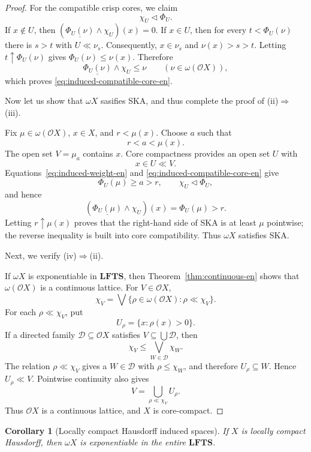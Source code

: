 \documentclass[11pt,a4paper]{article}
\numberwithin{equation}{section}
\newtheorem{corollary}[theorem]{Corollary}
\theoremstyle{definition}
\theoremstyle{remark}
\newcommand{\LFTS}{\mathbf{LFTS}}
\newcommand{\const}[1]{\underline{#1}}
\begin{document}
\begin{proof}
For the compatible crisp cores, we claim
\begin{equation}\label{eq:induced-compatible-core-en}
 \chi_U\triangleleft\Phi_U.
\end{equation}
If \(x\notin U\), then
\((\const{\Phi_U(\nu)}\wedge\chi_U)(x)=0\).  If \(x\in U\), then for
every \(t<\Phi_U(\nu)\) there is \(s>t\) with \(U\ll\nu_s\).
Consequently, \(x\in\nu_s\) and \(\nu(x)>s>t\).  Letting
\(t\uparrow\Phi_U(\nu)\) gives \(\Phi_U(\nu)\leq\nu(x)\).  Therefore
\[
 \const{\Phi_U(\nu)}\wedge\chi_U\leq\nu
 \qquad(\nu\in\omega(\mathcal OX)),
\]
which proves \eqref{eq:induced-compatible-core-en}.

Now let us show that $\omega X$ sasifies SKA, and thus complete the proof of (ii)\(\Rightarrow\)(iii).

Fix \(\mu\in\omega(\mathcal OX)\), \(x\in X\), and \(r<\mu(x)\).
Choose \(a\) such that
\[
 r<a<\mu(x).
\]
The open set \(V=\mu_a\) contains \(x\).  Core compactness provides an
open set \(U\) with
\[
 x\in U\ll V.
\]
Equations~\eqref{eq:induced-weight-en} and
\eqref{eq:induced-compatible-core-en} give
\[
 \Phi_U(\mu)\geq a>r,\qquad
 \chi_U\triangleleft\Phi_U,
\]
and hence
\[
 (\const{\Phi_U(\mu)}\wedge\chi_U)(x)
 =\Phi_U(\mu)>r.
\]
Letting \(r\uparrow\mu(x)\) proves that the right-hand side of SKA is
at least \(\mu\) pointwise; the reverse inequality is built into core
compatibility.  Thus \(\omega X\) satisfies SKA.

Next, we verify (iv)\(\Rightarrow\)(ii).

If \(\omega X\) is exponentiable in \(\LFTS\), then
Theorem~\ref{thm:continuous-en} shows that
\(\omega(\mathcal OX)\) is a continuous lattice.  For
\(V\in\mathcal OX\),
\[
 \chi_V
 =\bigvee\{\rho\in\omega(\mathcal OX):\rho\ll\chi_V\}.
\]
For each \(\rho\ll\chi_V\), put
\[
 U_\rho=\{x:\rho(x)>0\}.
\]
If a directed family \(\mathcal D\subseteq\mathcal OX\) satisfies
\(V\subseteq\bigcup\mathcal D\), then
\[
 \chi_V\leq\bigvee_{W\in\mathcal D}\chi_W.
\]
The relation \(\rho\ll\chi_V\) gives a \(W\in\mathcal D\) with
\(\rho\leq\chi_W\), and therefore \(U_\rho\subseteq W\).  Hence
\(U_\rho\ll V\).  Pointwise continuity also gives
\[
 V=\bigcup_{\rho\ll\chi_V}U_\rho.
\]
Thus \(\mathcal OX\) is a continuous lattice, and \(X\) is
core-compact.
\end{proof}

\begin{corollary}[Locally compact Hausdorff induced spaces]
\label{cor:lch-en}
If \(X\) is locally compact Hausdorff, then \(\omega X\) is
exponentiable in the entire \(\LFTS\).
\end{corollary}
\end{document}
